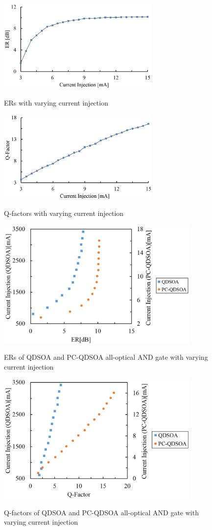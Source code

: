 \documentclass[twocolumn]{el-author}
\begin{document}
\begin{figure}[htbp]
\begin{center}
  \includegraphics[width=80mm,bb=0 0 996 485]{pcqdsoa_ERs.pdf}
  \caption{ERs with varying current injection}
  \label{fig:pcqdsoa_different_pump_current_ERs}
  \includegraphics[width=80mm,bb=0 0 991 484]{pcqdsoa_Qs.pdf}
  \caption{Q-factors with varying current injection}
  \label{fig:pcqdsoa_different_pump_current_Qs}
  \includegraphics[width=100mm,bb=0 0 1012 609]{qdsoa_vs_pcqdsoa_ERs.pdf}
  \caption{ERs of QDSOA and PC-QDSOA all-optical AND gate with varying current injection}
  \label{fig:comp_ERs}
  \includegraphics[width=100mm,bb=0 0 1010 619]{qdsoa_vs_pcqdsoa_Qs.pdf}
  \caption{Q-factors of QDSOA and PC-QDSOA all-optical AND gate with varying current injection}
  \label{fig:comp_Qs}
\end{center}
\end{figure}
\end{document}
